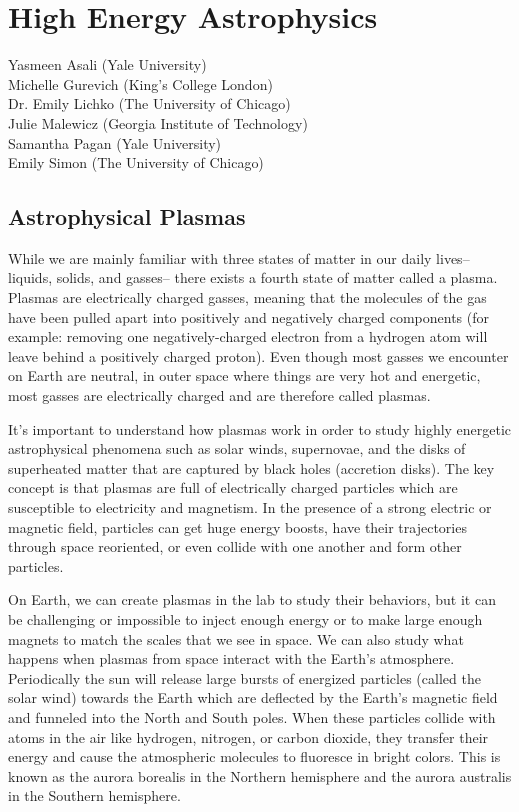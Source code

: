 \section{High Energy Astrophysics}

\begin{sectionauthor}
    Yasmeen Asali (Yale University) \\
    Michelle Gurevich (King's College London) \\
    Dr. Emily Lichko (The University of Chicago) \\
    Julie Malewicz (Georgia Institute of Technology) \\
    Samantha Pagan (Yale University) \\
    Emily Simon (The University of Chicago)
\end{sectionauthor}
\vspace{20pt}


\subsection{Astrophysical Plasmas}

While we are mainly familiar with three states of matter in our daily lives-- liquids, solids, and gasses-- there exists a fourth state of matter called a plasma. Plasmas are electrically charged gasses, meaning that the molecules of the gas have been pulled apart into positively and negatively charged components (for example: removing one negatively-charged electron from a hydrogen atom will leave behind a positively charged proton). Even though most gasses we encounter on Earth are neutral, in outer space where things are very hot and energetic, most gasses are electrically charged and are therefore called plasmas. 

It's important to understand how plasmas work in order to study highly energetic astrophysical phenomena such as solar winds, supernovae, and the disks of superheated matter that are captured by black holes (accretion disks). The key concept is that plasmas are full of electrically charged particles which are susceptible to electricity and magnetism. In the presence of a strong electric or magnetic field, particles can get huge energy boosts, have their trajectories through space reoriented, or even collide with one another and form other particles. 

On Earth, we can create plasmas in the lab to study their behaviors, but it can be challenging or impossible to inject enough energy or to make large enough magnets to match the scales that we see in space. We can also study what happens when plasmas from space interact with the Earth's atmosphere. Periodically the sun will release large bursts of energized particles (called the solar wind) towards the Earth which are deflected by the Earth's magnetic field and funneled into the North and South poles. When these particles collide with atoms in the air like hydrogen, nitrogen, or carbon dioxide, they transfer their energy and cause the atmospheric molecules to fluoresce in bright colors. This is known as the aurora borealis in the Northern hemisphere and the aurora australis in the Southern hemisphere.

